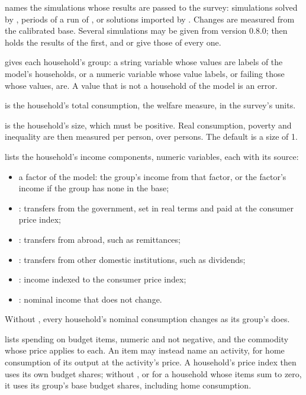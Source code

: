 \begin{optdesc}
\item[\optarg{}{sim}{names}] names the simulations whose results are passed to
the survey: simulations solved by , periods of a run of
, or solutions imported by \mbox{}. Changes
are measured from the calibrated base. Several simulations may be given from
version 0.8.0;  then holds the results of the first, and
 or  give those of every one.

\item[\optarg{}{group}{varname}] gives each household's group: a string
variable whose values are labels of the model's households, or a numeric
variable whose value labels, or failing those whose values, are. A value that
is not a household of the model is an error.

\item[\optarg{cons}{umption}{varname}] is the household's total consumption,
the welfare measure, in the survey's units.

\item[\optarg{}{size}{varname}] is the household's size, which must be
positive. Real consumption, poverty and inequality are then measured per
person, over persons. The default is a size of 1.

\item[\optarg{inc}{ome}{var\texttt{:}source \ldots}] lists the household's
income components, numeric variables, each with its source:
\begin{itemize}\setlength{\itemsep}{0pt}\setlength{\labelsep}{0.6em}
\item a factor of the model: the group's income from that factor, or the
factor's income if the group has none in the base;
\item {}: transfers from the government, set in real terms and paid at the consumer price index;
\item {}: transfers from abroad, such as remittances;
\item {}: transfers from other domestic institutions, such as
dividends;
\item {}: income indexed to the consumer price index;
\item {}: nominal income that does not change.
\end{itemize}
Without , every household's nominal consumption changes as its
group's does.

\item[\optarg{bud}{get}{var\texttt{:}commodity \ldots}] lists spending on
budget items, numeric and not negative, and the commodity whose price applies
to each. An item may instead name an activity, for home consumption of its
output at the activity's price. A household's price index then uses its own
budget shares; without , or for a household whose items sum to
zero, it uses its group's base budget shares, including home consumption.


\end{optdesc}
